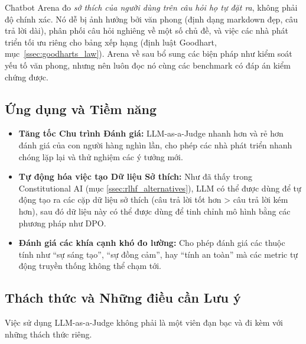 \begin{tcolorbox}[title={Arena có phải “sự thật”?}, colback=red!5!white, colframe=red!75!black, fonttitle=\bfseries]
Chatbot Arena đo \emph{sở thích của người dùng trên câu hỏi họ tự đặt ra}, không phải độ chính xác. Nó dễ bị ảnh hưởng bởi văn phong (định dạng markdown đẹp, câu trả lời dài), phân phối câu hỏi nghiêng về một số chủ đề, và việc các nhà phát triển tối ưu riêng cho bảng xếp hạng (định luật Goodhart, mục~\ref{ssec:goodharts_law}). Arena về sau bổ sung các biện pháp như kiểm soát yếu tố văn phong, nhưng nên luôn đọc nó cùng các benchmark có đáp án kiểm chứng được.
\end{tcolorbox}

\subsection{Ứng dụng và Tiềm năng}
\label{ssec:llm_judge_applications}

\begin{itemize}
    \item \textbf{Tăng tốc Chu trình Đánh giá:} LLM-as-a-Judge nhanh hơn và rẻ hơn đánh giá của con người hàng nghìn lần, cho phép các nhà phát triển nhanh chóng lặp lại và thử nghiệm các ý tưởng mới.
    \item \textbf{Tự động hóa việc tạo Dữ liệu Sở thích:} Như đã thấy trong Constitutional AI (mục \ref{ssec:rlhf_alternatives}), LLM có thể được dùng để tự động tạo ra các cặp dữ liệu sở thích (câu trả lời tốt hơn > câu trả lời kém hơn), sau đó dữ liệu này có thể được dùng để tinh chỉnh mô hình bằng các phương pháp như DPO.
    \item \textbf{Đánh giá các khía cạnh khó đo lường:} Cho phép đánh giá các thuộc tính như “sự sáng tạo”, “sự đồng cảm”, hay “tính an toàn” mà các metric tự động truyền thống không thể chạm tới.
\end{itemize}

\subsection{Thách thức và Những điều cần Lưu ý}
\label{ssec:llm_judge_challenges}
Việc sử dụng LLM-as-a-Judge không phải là một viên đạn bạc và đi kèm với những thách thức riêng.

